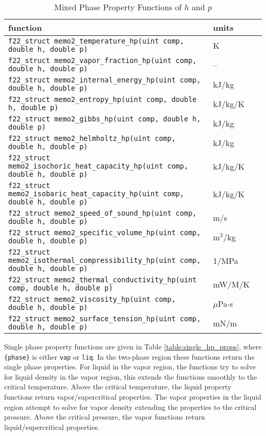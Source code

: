 \documentclass[oneside]{book}
\begin{document}
\begin{table}[h!]
\centering
\caption{Mixed Phase Property Functions of $h$ and $p$}
\begin{tabular}{ l l l }
\hline
function & units \\
\hline
\hline
\texttt{f22\_struct memo2\_temperature\_hp(uint comp, double h, double p)} & K  \\ [1ex]
\texttt{f22\_struct memo2\_vapor\_fraction\_hp(uint comp, double h, double p)} & -- \\ [1ex]
\texttt{f22\_struct memo2\_internal\_energy\_hp(uint comp, double h, double p)} &  kJ/kg \\ [1ex]
\texttt{f22\_struct memo2\_entropy\_hp(uint comp, double h, double p)} &  kJ/kg/K \\ [1ex]
\texttt{f22\_struct memo2\_gibbs\_hp(uint comp, double h, double p)} &  kJ/kg \\ [1ex]
\texttt{f22\_struct memo2\_helmholtz\_hp(uint comp, double h, double p)} &  kJ/kg \\ [1ex]
\texttt{f22\_struct memo2\_isochoric\_heat\_capacity\_hp(uint comp, double h, double p)} &  kJ/kg/K \\ [1ex]
\texttt{f22\_struct memo2\_isobaric\_heat\_capacity\_hp(uint comp, double h, double p)} &  kJ/kg/K \\ [1ex]
\texttt{f22\_struct memo2\_speed\_of\_sound\_hp(uint comp, double h, double p)} &  m/s \\ [1ex]
\texttt{f22\_struct memo2\_specific\_volume\_hp(uint comp, double h, double p)} &  m$^3$/kg \\ [1ex]
\texttt{f22\_struct memo2\_isothermal\_compressibility\_hp(uint comp, double h, double p)} &  1/MPa \\ [1ex]
\texttt{f22\_struct memo2\_thermal\_conductivity\_hp(uint comp, double h, double p)} &  mW/M/K \\ [1ex]
\texttt{f22\_struct memo2\_viscosity\_hp(uint comp, double h, double p)} &  $\mu$Pa$\cdot$s \\ [1ex]
\texttt{f22\_struct memo2\_surface\_tension\_hp(uint comp, double h, double p)} &  mN/m \\ [1ex]
\hline    
\end{tabular}
\label{table:mix_hp_props}
\end{table}

Single phase property functions are given in Table \ref{table:single_hp_props}, where \texttt{\{phase\}} is either \texttt{vap} or \texttt{liq}. In the two-phase region these functions return the single phase properties. For liquid in the vapor region, the functions try to solve for liquid density in the vapor region, this extends the functions smoothly to the critical temperature.  Above the critical temperature, the liquid property functions return vapor/supercritical properties. The vapor properties in the liquid region attempt to solve for vapor density extending the properties to the critical pressure. Above the critical pressure, the vapor functions return liquid/supercritical properties.
\end{document}
